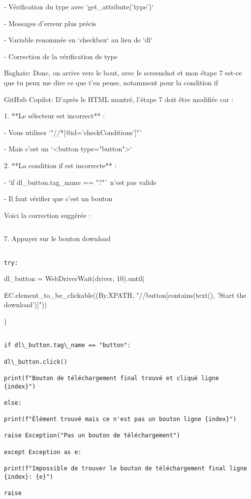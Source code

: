 - Vérification du type avec `get\_attribute('type')`

- Messages d'erreur plus précis

- Variable renommée en `checkbox` au lieu de `dl`

- Correction de la vérification de type

Baghate: Donc, on arrive vers le bout, avec le screenshot et mon étape 7 est-ce que tu peux me dire ce que t'en pense, notamment pour la condition if

GitHub Copilot: D'après le HTML montré, l'étape 7 doit être modifiée car :

1. **Le sélecteur est incorrect** :

- Vous utilisez `"//*[@id='checkConditions']"`

- Mais c'est un `<button type="button">`

2. **La condition if est incorrecte** :

- `if dl\_button.tag\_name == "?"` n'est pas valide

- Il faut vérifier que c'est un bouton

Voici la correction suggérée :

\begin{verbatim}

\end{verbatim}

  7. Appuyer sur le bouton download

\begin{verbatim}

try:

\end{verbatim}

dl\_button = WebDriverWait(driver, 10).until(

EC.element\_to\_be\_clickable((By.XPATH, "//button[contains(text(), 'Start the download')]"))

)

\begin{verbatim}

if dl\_button.tag\_name == "button":

dl\_button.click()

print(f"Bouton de téléchargement final trouvé et cliqué ligne {index}")

else:

print(f"Élément trouvé mais ce n'est pas un bouton ligne {index}")

raise Exception("Pas un bouton de téléchargement")

except Exception as e:

print(f"Impossible de trouver le bouton de téléchargement final ligne {index}: {e}")

raise

\end{verbatim}

